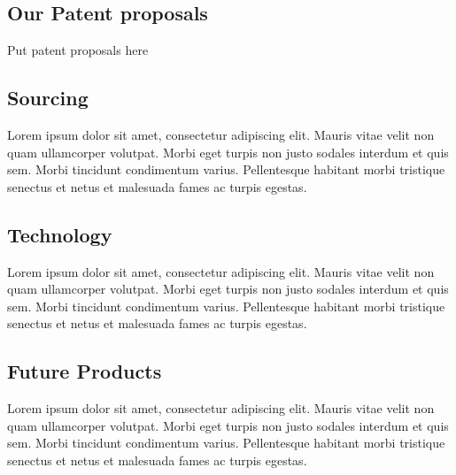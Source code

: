 \documentclass[11pt,titlepage]{article}
\begin{document}
\subsection{Our Patent proposals}
Put patent proposals here\newline

\subsection{Sourcing}
Lorem ipsum dolor sit amet, consectetur adipiscing elit. Mauris vitae velit 
non quam ullamcorper volutpat. Morbi eget turpis non justo sodales interdum 
et quis sem. Morbi tincidunt condimentum varius. Pellentesque habitant morbi 
tristique senectus et netus et malesuada fames ac turpis egestas.\newline
\subsection{Technology}
Lorem ipsum dolor sit amet, consectetur adipiscing elit. Mauris vitae velit 
non quam ullamcorper volutpat. Morbi eget turpis non justo sodales interdum 
et quis sem. Morbi tincidunt condimentum varius. Pellentesque habitant morbi 
tristique senectus et netus et malesuada fames ac turpis egestas.\newline
\subsection{Future Products}
Lorem ipsum dolor sit amet, consectetur adipiscing elit. Mauris vitae velit 
non quam ullamcorper volutpat. Morbi eget turpis non justo sodales interdum 
et quis sem. Morbi tincidunt condimentum varius. Pellentesque habitant morbi 
tristique senectus et netus et malesuada fames ac turpis egestas.\newline
\pagebreak
\end{document}

